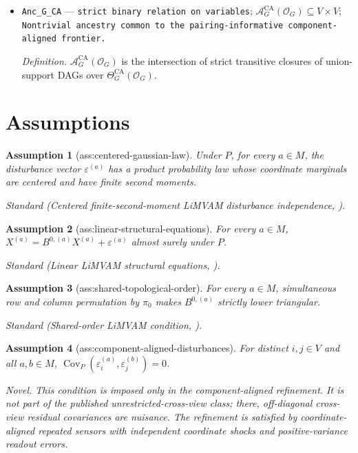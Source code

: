 \documentclass{article}
\newtheorem{assumption}{Assumption}
\begin{document}
\begin{itemize}
  \par\smallskip\noindent\emph{Definition.} \(N_{\mathrm{out}}^{\mathrm{CA}}=|\Theta_G^{\mathrm{CA}}(\mathcal O_G)|\).
  \item \texttt{Anc\_\allowbreak{}G\_\allowbreak{}CA} --- \texttt{strict binary relation on variables}; \(\mathcal A_G^{\mathrm{CA}}(\mathcal O_G)\subseteq V\times V\); \texttt{Nontrivial ancestry common to the pairing-\allowbreak{}informative component-\allowbreak{}aligned frontier.}
  \par\smallskip\noindent\emph{Definition.} \(\mathcal A_G^{\mathrm{CA}}(\mathcal O_G)\) is the intersection of strict transitive closures of union-support DAGs over \(\Theta_G^{\mathrm{CA}}(\mathcal O_G)\).
\end{itemize}

\section{Assumptions}

\begin{assumption}[ass:centered-gaussian-law]\label{ass:centered-gaussian-law}
Under \(P\), for every \(a\in M\), the disturbance vector \(\varepsilon^{(a)}\) has a product probability law whose coordinate marginals are centered and have finite second moments.
\par\smallskip\noindent\emph{Standard} (Centered finite-second-moment LiMVAM disturbance independence, \cite{HeurtebiseEtAl2026LiMVAM}).
\end{assumption}

\begin{assumption}[ass:linear-structural-equations]\label{ass:linear-structural-equations}
For every \(a\in M\), \(X^{(a)}=B^{0,(a)}X^{(a)}+\varepsilon^{(a)}\) almost surely under \(P\).
\par\smallskip\noindent\emph{Standard} (Linear LiMVAM structural equations, \cite{HeurtebiseEtAl2026LiMVAM}).
\end{assumption}

\begin{assumption}[ass:shared-topological-order]\label{ass:shared-topological-order}
For every \(a\in M\), simultaneous row and column permutation by \(\pi_0\) makes \(B^{0,(a)}\) strictly lower triangular.
\par\smallskip\noindent\emph{Standard} (Shared-order LiMVAM condition, \cite{HeurtebiseEtAl2026LiMVAM}).
\end{assumption}

\begin{assumption}[ass:component-aligned-disturbances]\label{ass:component-aligned-disturbances}
For distinct \(i,j\in V\) and all \(a,b\in M\), \(\operatorname{Cov}_P(\varepsilon_i^{(a)},\varepsilon_j^{(b)})=0\).
\par\smallskip\noindent\emph{Novel.} This condition is imposed only in the component-aligned refinement. It is not part of the published unrestricted-cross-view class; there, off-diagonal cross-view residual covariances are nuisance. The refinement is satisfied by coordinate-aligned repeated sensors with independent coordinate shocks and positive-variance readout errors.
\end{assumption}
\end{document}
